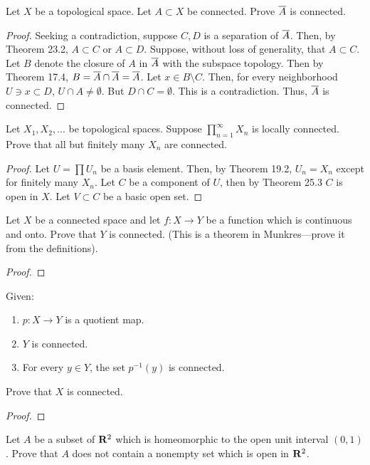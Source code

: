 \begin{problem}
Let $X$ be a topological space. Let $A\subset X$ be
connected. Prove $\overline{A}$ is connected.
\end{problem}
\begin{proof}
Seeking a contradiction, suppose $C,D$ is a separation of $\overline{A}$. Then, by Theorem 23.2, $A\subset C$ or $A\subset D$. Suppose,
without loss of generality, that $A\subset C$. Let $B$ denote the
closure of $A$ in $\overline{A}$ with the subspace topology. Then by
Theorem 17.4, $B=\overline{A}\cap\overline{A}=\overline{A}$. Let $x\in
B\setminus C$. Then, for every neighborhood $U\ni x\subset D$,
$U\cap A\neq\emptyset$. But $D\cap C=\emptyset$. This is a
contradiction. Thus, $\overline{A}$ is connected.
\end{proof}
\begin{problem}
Let $X_1,X_2,...$ be topological spaces. Suppose
$\prod_{n=1}^\infty X_n$ is locally connected. Prove that all but
finitely many $X_n$ are connected.
\end{problem}
\begin{proof}
Let $U=\prod U_n$ be a basis element. Then, by Theorem 19.2,
$U_n=X_n$ except for finitely many $X_n$. Let $C$ be a component
of $U$, then by Theorem 25.3 $C$ is open in $X$. Let $V\subset C$
be a basic open set.
\end{proof}
\begin{problem}
Let $X$ be a connected space and let $f\colon X\to Y$ be a
function which is continuous and onto. Prove that $Y$ is
connected. (This is a theorem in Munkres---prove it from the
definitions).
\end{problem}
\begin{proof}
\end{proof}
\begin{problem}
Given:
\begin{enumerate}[noitemsep,label=(\roman*)]
\item $p\colon X\to Y$ is a quotient map.
\item $Y$ is connected.
\item For every $y\in Y$, the set $p^{-1}(y)$ is connected.
\end{enumerate}
Prove that $X$ is connected.
\end{problem}
\begin{proof}
\end{proof}
\begin{problem}
Let $A$ be a subset of $\mathbf{R}^2$ which is homeomorphic to the open
unit interval $(0,1)$. Prove that $A$ does not contain a nonempty
set which is open in $\mathbf{R}^2$.
\end{problem}
